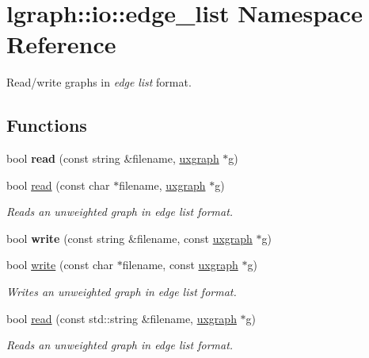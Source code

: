 \hypertarget{namespacelgraph_1_1io_1_1edge__list}{}\section{lgraph\+:\+:io\+:\+:edge\+\_\+list Namespace Reference}
\label{namespacelgraph_1_1io_1_1edge__list}


Read/write graphs in {\itshape edge} {\itshape list} format.  


\subsection*{Functions}
\begin{DoxyCompactItemize}
\item 
\mbox{\label{namespacelgraph_1_1io_1_1edge__list_a96641b61b03162a623ba111d323f5650}} 
bool {\bfseries read} (const string \&filename, \hyperlink{classlgraph_1_1uxgraph}{uxgraph} $\ast$g)
\item 
bool \hyperlink{namespacelgraph_1_1io_1_1edge__list_a1861bd84b7b67c310fd1b13534b7308b}{read} (const char $\ast$filename, \hyperlink{classlgraph_1_1uxgraph}{uxgraph} $\ast$g)
\begin{DoxyCompactList}\small\item\em Reads an unweighted graph in edge list format. \end{DoxyCompactList}\item 
\mbox{\label{namespacelgraph_1_1io_1_1edge__list_af5a408f275374a260750836d30d2f820}} 
bool {\bfseries write} (const string \&filename, const \hyperlink{classlgraph_1_1uxgraph}{uxgraph} $\ast$g)
\item 
bool \hyperlink{namespacelgraph_1_1io_1_1edge__list_aed1aa537146bbb2f4f2308a04ec12ff6}{write} (const char $\ast$filename, const \hyperlink{classlgraph_1_1uxgraph}{uxgraph} $\ast$g)
\begin{DoxyCompactList}\small\item\em Writes an unweighted graph in edge list format. \end{DoxyCompactList}\item 
bool \hyperlink{namespacelgraph_1_1io_1_1edge__list_a51d3431a6910ab3120f2d12efb7c2073}{read} (const std\+::string \&filename, \hyperlink{classlgraph_1_1uxgraph}{uxgraph} $\ast$g)
\begin{DoxyCompactList}\small\item\em Reads an unweighted graph in edge list format. \end{DoxyCompactList}\item 

\end{DoxyCompactItemize}
